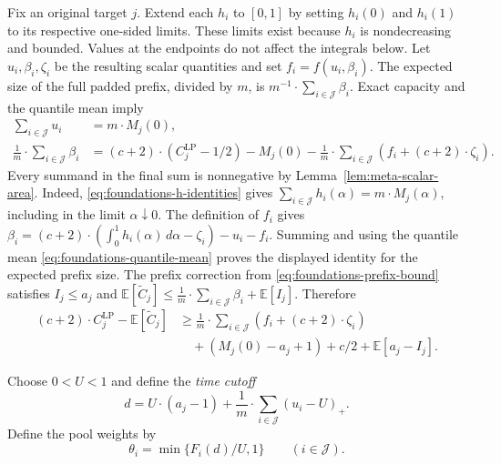 Fix an original target $j$.
Extend each $h_i$ to $[0,1]$ by setting $h_i(0)$ and $h_i(1)$ to its
respective one-sided limits. These limits exist because $h_i$ is nondecreasing and
bounded. Values at the endpoints do not affect the integrals below. Let
$u_i,\beta_i,\zeta_i$ be the resulting scalar quantities and set
$f_i=f(u_i,\beta_i)$. The expected size of the
full padded prefix, divided by $m$, is $m^{-1}\cdot\sum_{i\in\mathcal J}\beta_i$. Exact capacity
and the quantile mean imply
\begin{align*}
 \sum_{i\in\mathcal J}u_i&=m\cdot M_j(0),\\
 \frac1m\cdot\sum_{i\in\mathcal J}\beta_i
 &=(c+2)\cdot(C_j^{\mathrm{LP}}-1/2)-M_j(0)
   -\frac1m\cdot\sum_{i\in\mathcal J}(f_i+(c+2)\cdot\zeta_i).
\end{align*}
Every summand in the final sum is nonnegative by
Lemma~\ref{lem:meta-scalar-area}.
Indeed, \eqref{eq:foundations-h-identities} gives
$\sum_{i\in\mathcal J} h_i(\alpha)=m\cdot M_j(\alpha)$, including in the limit
$\alpha\downarrow0$. The definition of $f_i$ gives
$\beta_i=(c+2)\cdot(\int_0^1h_i(\alpha)\,d\alpha-\zeta_i)-u_i-f_i$.
Summing and using the quantile mean \eqref{eq:foundations-quantile-mean}
proves the displayed identity for the expected prefix size.
The prefix correction from \eqref{eq:foundations-prefix-bound}
satisfies $I_j\le a_j$ and
$\mathbb E[\widetilde C_j]\le\frac1m\cdot\sum_{i\in\mathcal J}\beta_i+\mathbb E[I_j]$. Therefore
\begin{equation}
\begin{aligned}
 (c+2)\cdot C_j^{\mathrm{LP}}-\mathbb E[\widetilde C_j]
 &\ge\frac1m\cdot\sum_{i\in\mathcal J}(f_i+(c+2)\cdot\zeta_i)\\
 &\quad +(M_j(0)-a_j+1)+c/2+\mathbb E[a_j-I_j].
\end{aligned}
 \label{eq:meta-gap-identity}
\end{equation}

Choose $0<U<1$ and define the \emph{time cutoff}
\begin{equation}
 d=U\cdot(a_j-1)+\frac1m\cdot\sum_{i\in\mathcal J}(u_i-U)_+.
 \label{eq:meta-automatic-cut}
\end{equation}
Define the pool weights by
\[
 \theta_i=\min\{F_i(d)/U,1\}\qquad(i\in\mathcal J).
\]

